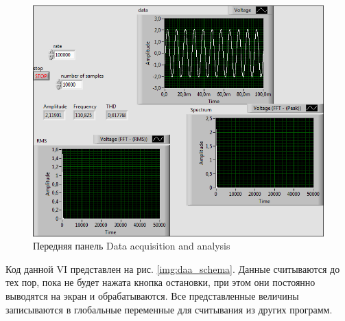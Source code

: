 \documentclass[a4paper,14pt]{article}
\begin{document}
\begin{figure}[H]
	\centering
	\includegraphics[width=\linewidth]{image/daa_vi}
	\caption{Передняя панель Data acquisition and analysis}\label{img:daa_vi}
\end{figure}

Код данной VI представлен на рис. \ref{img:daa_schema}.
Данные считываются до тех пор, пока не будет нажата кнопка остановки, при этом они постоянно выводятся на экран и обрабатываются.
Все представленные величины записываются в глобальные переменные для считывания из других программ.
\end{document}

